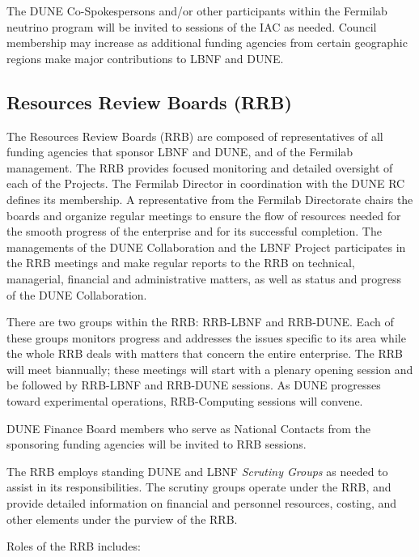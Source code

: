 The DUNE Co-Spokespersons and/or other participants within
the Fermilab neutrino program will be invited to sessions of the IAC as
needed. Council membership may increase as additional funding agencies
from certain geographic regions make major contributions to LBNF and DUNE.

\subsection{Resources Review Boards (RRB)}

The Resources Review Boards (RRB) are composed of representatives of all
funding agencies that sponsor LBNF and DUNE, and of the Fermilab
management. The RRB provides focused monitoring and detailed oversight
of each of the Projects. The Fermilab Director in coordination
with the DUNE RC defines its membership. A representative from the
Fermilab Directorate chairs the boards and
organize regular meetings to ensure the flow of resources needed
for the smooth progress of the enterprise 
and for its successful completion.  
The managements of the
DUNE Collaboration and the LBNF Project participates in the RRB meetings
and make regular reports to the RRB on technical, managerial,
financial and administrative matters, as well as status and
progress of the DUNE Collaboration.

There are two groups  
within the RRB: RRB-LBNF and RRB-DUNE. Each of
these groups monitors progress and addresses 
 the issues specific to its area 
 while the whole RRB deals with matters
that concern the entire enterprise. 
The RRB will meet
biannually; these meetings 
will start with a plenary
opening session 
and be followed by 
RRB-LBNF and RRB-DUNE sessions. As DUNE progresses toward
experimental operations, RRB-Computing sessions will convene.

DUNE Finance Board members who serve as National Contacts from the 
sponsoring funding agencies will be invited to RRB sessions.

The RRB  employs standing DUNE and LBNF \textit{Scrutiny Groups} as needed
to assist in its responsibilities. The scrutiny groups operate
under the RRB, and provide detailed information on financial and
personnel resources, costing, and other elements under the purview of the RRB.

Roles of the RRB includes:

